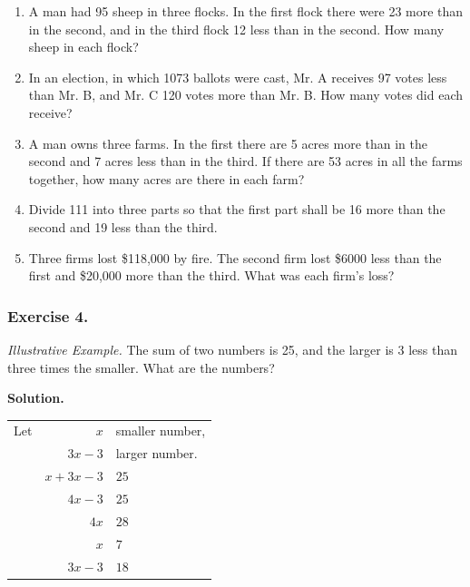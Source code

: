 \documentclass{book}
\begin{document}
\begin{enumerate}
\item A man had 95 sheep in three flocks. In the first
flock there were 23 more than in the second, and in the
third flock 12 less than in the second. How many sheep
in each flock?

\item In an election, in which 1073 ballots were cast, Mr.
A receives 97 votes less than Mr. B, and Mr. C 120 votes
more than Mr. B. How many votes did each receive?

\item A man owns three farms. In the first there are
5 acres more than in the second and 7 acres less than in
the third. If there are 53 acres in all the farms together,
how many acres are there in each farm?

\item Divide 111 into three parts so that the first part
shall be 16 more than the second and 19 less than the
third.

\item Three firms lost \$118,000 by fire. The second firm
lost \$6000 less than the first and \$20,000 more than the
third. What was each firm's loss?
\end{enumerate}

\subsubsection*{Exercise 4.}

\textit{ Illustrative Example.} The sum of two numbers is 25, and
the larger is 3 less than three times the smaller. What are the
numbers?

\begin{center}
\textbf{ Solution.} \\
\end{center}
\begin{center}
\begin{tabular}{lr@{=}l}
Let & $x$      & smaller number,\\
    & $3x - 3$ & larger number. \\
    & $x+3x-3$ &$25$ \\
    & $4x-3$   &$25$ \\
    & $4x$     &$28$\footnotemark \\
    & $x$      &$7$  \\
    & $3x-3$   &$18$ \\
\end{tabular}
\end{center}
\end{document}
